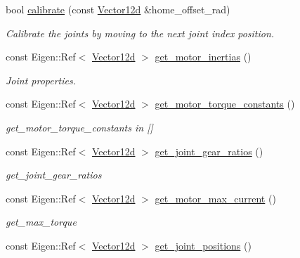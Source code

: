 \begin{DoxyCompactItemize}
bool \hyperlink{classblmc__robots_1_1Solo12_a8b9bfe0950a5d54ea5528aa98204f651}{calibrate} (const \hyperlink{common__header_8hpp_a80313eb420184518596e745eecf4b494}{Vector12d} \&home\+\_\+offset\+\_\+rad)
\begin{DoxyCompactList}\small\item\em Calibrate the joints by moving to the next joint index position. \end{DoxyCompactList}\item 
const Eigen\+::\+Ref$<$ \hyperlink{common__header_8hpp_a80313eb420184518596e745eecf4b494}{Vector12d} $>$ \hyperlink{classblmc__robots_1_1Solo12_a9ce8856916fb841f127be1920d18fea9}{get\+\_\+motor\+\_\+inertias} ()
\begin{DoxyCompactList}\small\item\em Joint properties. \end{DoxyCompactList}\item 
const Eigen\+::\+Ref$<$ \hyperlink{common__header_8hpp_a80313eb420184518596e745eecf4b494}{Vector12d} $>$ \hyperlink{classblmc__robots_1_1Solo12_a2135c79bff566dc0f8bace78bcf0b714}{get\+\_\+motor\+\_\+torque\+\_\+constants} ()
\begin{DoxyCompactList}\small\item\em get\+\_\+motor\+\_\+torque\+\_\+constants in \mbox{[}\mbox{]} \end{DoxyCompactList}\item 
const Eigen\+::\+Ref$<$ \hyperlink{common__header_8hpp_a80313eb420184518596e745eecf4b494}{Vector12d} $>$ \hyperlink{classblmc__robots_1_1Solo12_ab24a09564c336625a945523a74f91112}{get\+\_\+joint\+\_\+gear\+\_\+ratios} ()
\begin{DoxyCompactList}\small\item\em get\+\_\+joint\+\_\+gear\+\_\+ratios \end{DoxyCompactList}\item 
const Eigen\+::\+Ref$<$ \hyperlink{common__header_8hpp_a80313eb420184518596e745eecf4b494}{Vector12d} $>$ \hyperlink{classblmc__robots_1_1Solo12_aa1994a07d52a00275e0c85f0ad38fb12}{get\+\_\+motor\+\_\+max\+\_\+current} ()
\begin{DoxyCompactList}\small\item\em get\+\_\+max\+\_\+torque \end{DoxyCompactList}\item 
const Eigen\+::\+Ref$<$ \hyperlink{common__header_8hpp_a80313eb420184518596e745eecf4b494}{Vector12d} $>$ \hyperlink{classblmc__robots_1_1Solo12_a6ce3b791bba7cc37621a63ee6447c9c0}{get\+\_\+joint\+\_\+positions} ()

\end{DoxyCompactItemize}

